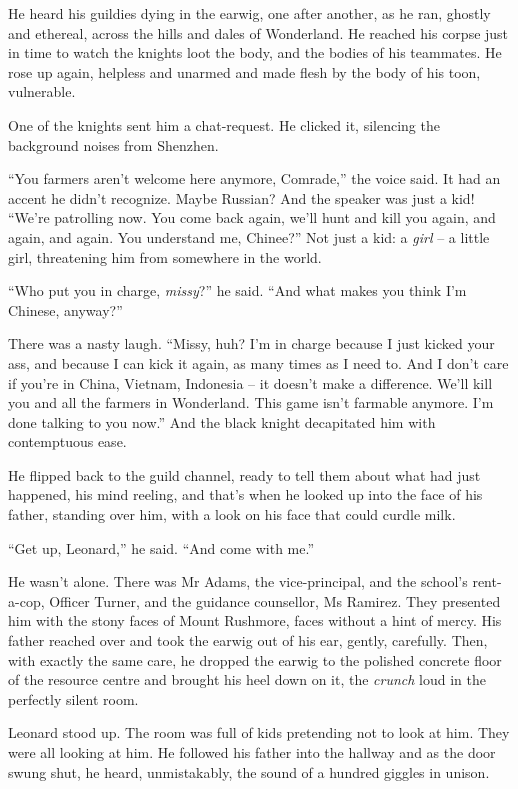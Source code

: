 He heard his guildies dying in the earwig, one after another, as he
ran, ghostly and ethereal, across the hills and dales of
Wonderland. He reached his corpse just in time to watch the knights
loot the body, and the bodies of his teammates. He rose up again,
helpless and unarmed and made flesh by the body of his toon,
vulnerable.

One of the knights sent him a chat-request. He clicked it,
silencing the background noises from Shenzhen.

``You farmers aren't welcome here anymore, Comrade,'' the voice said.
It had an accent he didn't recognize. Maybe Russian? And the
speaker was just a kid! ``We're patrolling now. You come back again,
we'll hunt and kill you again, and again, and again. You understand
me, Chinee?'' Not just a kid: a \emph{girl} -- a little girl,
threatening him from somewhere in the world.

``Who put you in charge, \emph{missy}?'' he said. ``And what makes you
think I'm Chinese, anyway?''

There was a nasty laugh. ``Missy, huh? I'm in charge because I just
kicked your ass, and because I can kick it again, as many times as
I need to. And I don't care if you're in China, Vietnam, Indonesia
-- it doesn't make a difference. We'll kill you and all the farmers
in Wonderland. This game isn't farmable anymore. I'm done talking
to you now.'' And the black knight decapitated him with contemptuous
ease.

He flipped back to the guild channel, ready to tell them about what
had just happened, his mind reeling, and that's when he looked up
into the face of his father, standing over him, with a look on his
face that could curdle milk.

``Get up, Leonard,'' he said. ``And come with me.''

He wasn't alone. There was Mr Adams, the vice-principal, and the
school's rent-a-cop, Officer Turner, and the guidance counsellor,
Ms Ramirez. They presented him with the stony faces of Mount
Rushmore, faces without a hint of mercy. His father reached over
and took the earwig out of his ear, gently, carefully. Then, with
exactly the same care, he dropped the earwig to the polished
concrete floor of the resource centre and brought his heel down on
it, the \emph{crunch} loud in the perfectly silent room.

Leonard stood up. The room was full of kids pretending not to look
at him. They were all looking at him. He followed his father into
the hallway and as the door swung shut, he heard, unmistakably, the
sound of a hundred giggles in unison.


